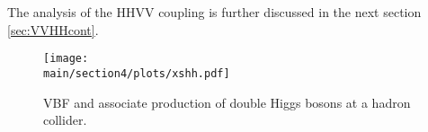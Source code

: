 The analysis of the HHVV coupling is further discussed in the next section \ref{sec:VVHHcont}.



\begin{figure}[!t]
\centering
   \texttt{[image: \\main/section4/plots/xshh.pdf]}
  \caption{VBF  and associate production of double Higgs bosons at a hadron collider. \label{fig:xshh}}
\end{figure}

